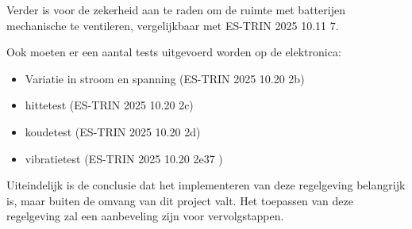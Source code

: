 Verder is voor de zekerheid aan te raden om de ruimte met batterijen mechanische te ventileren, vergelijkbaar met ES-TRIN 2025 10.11 7.

Ook moeten er een aantal tests uitgevoerd worden op de elektronica:
\begin{itemize}
    \item Variatie in stroom en spanning (ES-TRIN 2025 10.20 2b)
    \item hittetest (ES-TRIN 2025 10.20 2c)
    \item koudetest (ES-TRIN 2025 10.20 2d)
    \item vibratietest (ES-TRIN 2025 10.20 2e37
    )
\end{itemize}

Uiteindelijk is de conclusie dat het implementeren van deze regelgeving belangrijk is, maar buiten de omvang van dit project valt. Het toepassen van deze regelgeving zal een aanbeveling zijn voor vervolgstappen.
